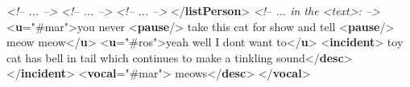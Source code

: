 \begin{shaded}
\mbox{}\newline 
\textit{<!-- ... -->}\mbox{}\newline 
{}\mbox{}\newline 
{}\mbox{}\newline 
\textit{<!-- ... -->}\mbox{}\newline 
{}\mbox{}\newline 
{}\mbox{}\newline 
\textit{<!-- ... -->}\mbox{}\newline 
{}\mbox{}\newline 
{</\textbf{listPerson}>}\mbox{}\newline 
\textit{<!-- ... in the <text>: -->}\mbox{}\newline 
{<\textbf{u}\hspace*{1em}{who}="{\#mar}">}you\mbox{}\newline 
 never {<\textbf{pause}/>} take this cat for show and tell\mbox{}\newline 
{<\textbf{pause}/>} meow meow{</\textbf{u}>}\mbox{}\newline 
{<\textbf{u}\hspace*{1em}{who}="{\#ros}">}yeah well I dont want to{</\textbf{u}>}\mbox{}\newline 
{<\textbf{incident}>}\mbox{}\newline 
{}toy cat has bell in tail which continues to make a tinkling sound{</\textbf{desc}>}\mbox{}\newline 
{</\textbf{incident}>}\mbox{}\newline 
{<\textbf{vocal}\hspace*{1em}{who}="{\#mar}">}\mbox{}\newline 
{}meows{</\textbf{desc}>}\mbox{}\newline 
{</\textbf{vocal}>}\mbox{}\newline 

\end{shaded}
